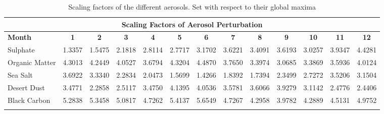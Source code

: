 \begin{landscape}
    \begin{longtable}{|l|c|c|c|c|c|c|c|c|c|c|c|c|}
            \hline 
            \multicolumn{13}{|c|}{  \textbf{Scaling Factors of Aerosol Perturbation} }\\
            \hline 
                   
              \textbf{Month}&\textbf{1}&\textbf{2}&\textbf{3}&\textbf{4}&\textbf{5}&\textbf{6}&\textbf{7}&\textbf{8}&\textbf{9}&\textbf{10}&\textbf{11}&\textbf{12}\\
            \hline 
            \hline
            Sulphate&1.3357& 1.5475 & 2.1818 & 2.8114 & 2.7717 &  3.1702 & 3.6221 & 3.4091 & 3.6193 & 3.0257 & 3.9347 & 4.4281 \\
            \hline
            Organic Matter & 4.3013 & 4.2449 & 4.0527 & 3.6794 &  4.3204 &  4.4870 & 3.7650 & 3.3974 & 3.0685 & 3.3869 & 3.5936 & 4.0124\\
            \hline
            Sea Salt&3.6922 & 3.3340 & 2.2834 & 2.0473 & 1.5699 &  1.4266 &  1.8392 & 1.7394 & 2.3499 & 2.7272 & 3.5206 & 3.1504 \\
            \hline
            Desert Dust& 3.4771 & 2.2858 & 2.5117 & 3.4750 &  4.1395 & 4.0536 & 3.5781 & 3.6066 & 3.9279 & 3.1142 &  2.4776 & 2.4406\\
            \hline
            Black Carbon &  5.2838&  5.3458 & 5.0817 & 4.7262 & 5.4137 & 5.6549 & 4.7267 & 4.2958 & 3.9782 & 4.2889 & 4.5131 & 4.9752 \\
            \hline
    \caption{Scaling factors  \label{tab:scale_aerosol} of the different aerosols. Set with respect to their global maxima}
    \end{longtable}
\end{landscape}

